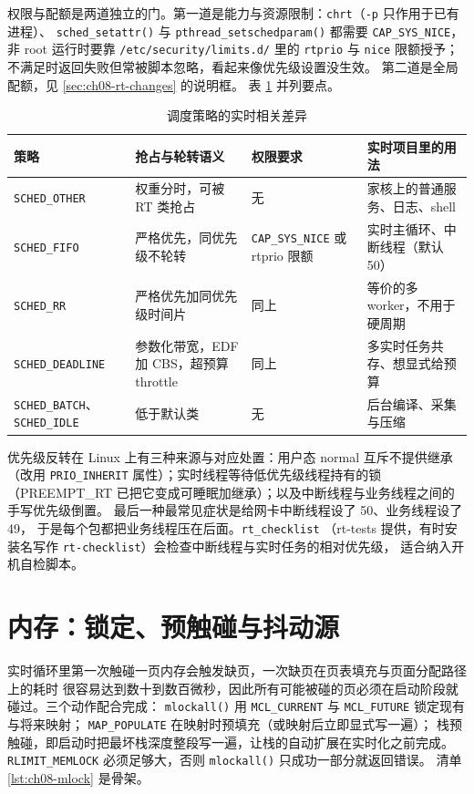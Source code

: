 \documentclass[12pt,a4paper,fontset=fandol]{ctexbook}
\newcommand{\Fn}[1]{\texttt{#1()}}
\newcommand{\Tp}[1]{\texttt{#1}}
\begin{document}
权限与配额是两道独立的门。第一道是能力与资源限制：\Tp{chrt}（\Tp{-p} 只作用于已有进程）、
\Fn{sched\_setattr} 与 \Fn{pthread\_setschedparam} 都需要 \Tp{CAP\_SYS\_NICE}，
非 root 运行时要靠 \Tp{/etc/security/limits.d/} 里的 \Tp{rtprio} 与 \Tp{nice} 限额授予；
不满足时返回失败但常被脚本忽略，看起来像优先级设置没生效。
第二道是全局配额，见 \ref{sec:ch08-rt-changes} 的说明框。
表 \ref{tab:ch08-policies} 并列要点。

\begin{table}[htbp]
\centering
\caption{调度策略的实时相关差异}\label{tab:ch08-policies}
\begin{tabular}{>{\raggedright\arraybackslash}p{}
                >{\raggedright\arraybackslash}p{}
                >{\raggedright\arraybackslash}p{}
                >{\raggedright\arraybackslash}p{}}
\toprule
策略 & 抢占与轮转语义 & 权限要求 & 实时项目里的用法 \\
\midrule
\Tp{SCHED\_OTHER} & 权重分时，可被 RT 类抢占 & 无 & 家核上的普通服务、日志、shell \\
\Tp{SCHED\_FIFO} & 严格优先，同优先级不轮转 & \Tp{CAP\_SYS\_NICE} 或 rtprio 限额 & 实时主循环、中断线程（默认 50） \\
\Tp{SCHED\_RR} & 严格优先加同优先级时间片 & 同上 & 等价的多 worker，不用于硬周期 \\
\Tp{SCHED\_DEADLINE} & 参数化带宽，EDF 加 CBS，超预算 throttle & 同上 & 多实时任务共存、想显式给预算 \\
\Tp{SCHED\_BATCH}、\Tp{SCHED\_IDLE} & 低于默认类 & 无 & 后台编译、采集与压缩 \\
\bottomrule
\end{tabular}
\end{table}

优先级反转在 Linux 上有三种来源与对应处置：用户态 normal 互斥不提供继承
（改用 \Tp{PRIO\_INHERIT} 属性）；实时线程等待低优先级线程持有的锁
（PREEMPT\_RT 已把它变成可睡眠加继承）；以及中断线程与业务线程之间的手写优先级倒置。
最后一种最常见症状是给网卡中断线程设了 50、业务线程设了 49，
于是每个包都把业务线程压在后面。\Tp{rt\_checklist}
（rt-tests 提供，有时安装名写作 \Tp{rt-checklist}）会检查中断线程与实时任务的相对优先级，
适合纳入开机自检脚本。

\section{内存：锁定、预触碰与抖动源}
\label{sec:ch08-memory}

实时循环里第一次触碰一页内存会触发缺页，一次缺页在页表填充与页面分配路径上的耗时
很容易达到数十到数百微秒，因此所有可能被碰的页必须在启动阶段就碰过。三个动作配合完成：
\Fn{mlockall} 用 \Tp{MCL\_CURRENT} 与 \Tp{MCL\_FUTURE} 锁定现有与将来映射；
\Tp{MAP\_POPULATE} 在映射时预填充（或映射后立即显式写一遍）；
栈预触碰，即启动时把最坏栈深度整段写一遍，让栈的自动扩展在实时化之前完成。
\Tp{RLIMIT\_MEMLOCK} 必须足够大，否则 \Fn{mlockall} 只成功一部分就返回错误。
清单 \ref{lst:ch08-mlock} 是骨架。
\end{document}
